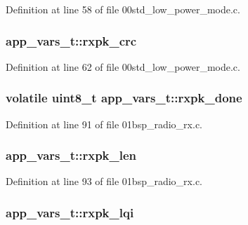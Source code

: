 Definition at line 58 of file 00std\+\_\+low\+\_\+power\+\_\+mode.\+c.

\subsubsection[{\texorpdfstring{rxpk\+\_\+crc}{rxpk_crc}}]{ app\+\_\+vars\+\_\+t\+::rxpk\+\_\+crc}\hypertarget{structapp__vars__t_aaf85edfe86a3d6a0c12013e06fd7f8da}{}\label{structapp__vars__t_aaf85edfe86a3d6a0c12013e06fd7f8da}


Definition at line 62 of file 00std\+\_\+low\+\_\+power\+\_\+mode.\+c.

\subsubsection[{\texorpdfstring{rxpk\+\_\+done}{rxpk_done}}]{\setlength{\rightskip}{0pt plus 5cm}volatile {\bf uint8\+\_\+t} app\+\_\+vars\+\_\+t\+::rxpk\+\_\+done}\hypertarget{structapp__vars__t_ad4ad635d2de9a09a9451e976191ac7e8}{}\label{structapp__vars__t_ad4ad635d2de9a09a9451e976191ac7e8}


Definition at line 91 of file 01bsp\+\_\+radio\+\_\+rx.\+c.

\subsubsection[{\texorpdfstring{rxpk\+\_\+len}{rxpk_len}}]{ app\+\_\+vars\+\_\+t\+::rxpk\+\_\+len}\hypertarget{structapp__vars__t_a93da463733561ea25e5baa994e56553c}{}\label{structapp__vars__t_a93da463733561ea25e5baa994e56553c}


Definition at line 93 of file 01bsp\+\_\+radio\+\_\+rx.\+c.

\subsubsection[{\texorpdfstring{rxpk\+\_\+lqi}{rxpk_lqi}}]{ app\+\_\+vars\+\_\+t\+::rxpk\+\_\+lqi}\hypertarget{structapp__vars__t_ad66d74916e8d21e075973dc7809b66ac}{}\label{structapp__vars__t_ad66d74916e8d21e075973dc7809b66ac}


